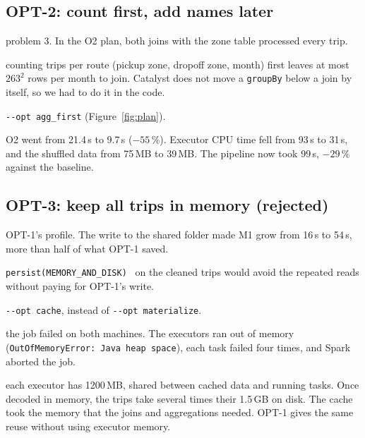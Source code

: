 \documentclass[sigconf]{acmart}
\newcommand{\opt}[1]{\texttt{-{}-opt #1}}
\newenvironment{steps}{\begin{description}[nosep, leftmargin=0pt, font=\normalfont\itshape]}{\end{description}}
\begin{document}
\subsection{OPT-2: count first, add names later}
\begin{steps}
  \item[What we saw:] problem 3. In the O2 plan, both joins with the zone table processed every trip.
  \item[What we expected:] counting trips per route (pickup zone, dropoff zone, month) first leaves at most
    $263^2$ rows per month to join. Catalyst does not move a \texttt{groupBy} below a join by itself, so we had to
    do it in the code.
  \item[What we changed:] \opt{agg\_first} (Figure~\ref{fig:plan}).
  \item[What happened:] O2 went from 21.4\,s to 9.7\,s ($-55$\,\%). Executor CPU time fell from 93\,s to 31\,s, and the
    shuffled data from 75\,MB to 39\,MB. The pipeline now took 99\,s, $-29$\,\% against the baseline.
\end{steps}

\subsection{OPT-3: keep all trips in memory (rejected)}
\begin{steps}
  \item[What we saw:] OPT-1's profile. The write to the shared folder made M1 grow from 16\,s to 54\,s, more than
    half of what OPT-1 saved.
  \item[What we expected:] \texttt{persist(MEMORY\_AND\_DISK)}~\cite{zaharia2012rdd} on the cleaned trips would
    avoid the repeated reads without paying for OPT-1's write.
  \item[What we changed:] \opt{cache}, instead of \opt{materialize}.
  \item[What happened:] the job failed on both machines. The executors ran out of memory
    (\texttt{OutOfMemoryError: Java heap space}), each task failed four times, and Spark aborted the job.
  \item[Why:] each executor has 1200\,MB, shared between cached data and running tasks. Once decoded in memory, the
    trips take several times their 1.5\,GB on disk. The cache took the memory that the joins and aggregations
    needed. OPT-1 gives the same reuse without using executor memory.
\end{steps}
\end{document}
